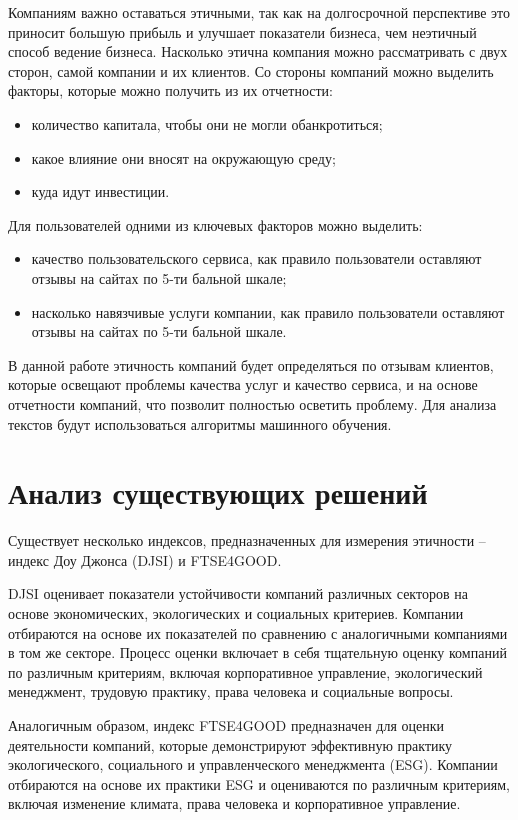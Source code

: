 \documentclass[PI, VKR]{HSEUniversity}
\begin{document}
Компаниям важно оставаться этичными, так как на долгосрочной перспективе это приносит большую прибыль и улучшает показатели бизнеса, чем неэтичный способ ведение бизнеса\autocites{climent_ethical_2018}[][]{mure_esg_2021}. Насколько этична компания можно рассматривать с двух сторон, самой компании и их клиентов. Со стороны компаний можно выделить факторы, которые можно получить из их отчетности:
\begin{itemize}
\item количество капитала, чтобы они не могли обанкротиться;
\item какое влияние они вносят на окружающую среду;
\item куда идут инвестиции\autocite{harvey_ethical_1995}.
\end{itemize}
Для пользователей одними из ключевых факторов можно выделить:
\begin{itemize}
\item качество пользовательского сервиса\autocite{brunk_exploring_2010}, как правило пользователи оставляют отзывы на сайтах по 5-ти бальной шкале;
\item насколько навязчивые услуги компании\autocite{mitchell_bank_1992}, как правило пользователи оставляют отзывы на сайтах по 5-ти бальной шкале.
\end{itemize}

В данной работе этичность компаний будет определяться по отзывам клиентов, которые освещают проблемы качества услуг и качество сервиса, и на основе отчетности компаний, что позволит полностью осветить проблему. Для анализа текстов будут использоваться алгоритмы машинного обучения.
\section{Анализ существующих решений}
\label{sec:orgb74cb79}
Существует несколько индексов, предназначенных для измерения этичности -- индекс Доу Джонса (DJSI)\autocite{lopez_sustainable_2007} и FTSE4GOOD\autocite{collison_financial_2008}.

DJSI оценивает показатели устойчивости компаний различных секторов на основе экономических, экологических и социальных критериев. Компании отбираются на основе их показателей по сравнению с аналогичными компаниями в том же секторе. Процесс оценки включает в себя тщательную оценку компаний по различным критериям, включая корпоративное управление, экологический менеджмент, трудовую практику, права человека и социальные вопросы.

Аналогичным образом, индекс FTSE4GOOD предназначен для оценки деятельности компаний, которые демонстрируют эффективную практику экологического, социального и управленческого менеджмента (ESG). Компании отбираются на основе их практики ESG и оцениваются по различным критериям, включая изменение климата, права человека и корпоративное управление.
\end{document}
